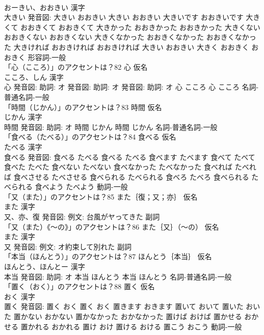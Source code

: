\documentclass[8pt]{extreport}
\begin{document}
\begin{CJK}{UTF8}{min}
\\	おーきい、おおきい 漢字　
\\	大きい 発音図:	大きい おおきい		大きい おおきい 大きいです おおきいです 大きくて おおきくて おおきくて 大きかった おおきかった おおきかった 大きくない おおきくない おおきくない 大きくなかった おおきくなかった おおきくなかった 大きければ おおきければ おおきければ 大きい おおきい 大きく おおきく おおきく				形容詞-一般 
\\	「心（こころ）」のアクセントは？82	心 仮名　
\\	こころ、しん 漢字　
\\	心 発音図: 助詞: オ 発音図: 助詞: オ 発音図: 助詞: オ	心 こころ		心 こころ				名詞-普通名詞-一般 
\\	「時間（じかん）」のアクセントは？83	時間 仮名　
\\	じかん 漢字　
\\	時間 発音図: 助詞: オ	時間 じかん		時間 じかん				名詞-普通名詞-一般 
\\	「食べる（たべる）」のアクセントは？84	食べる 仮名　
\\	たべる 漢字　
\\	食べる 発音図:	食べる たべる		食べる たべる 食べます たべます 食べて たべて 食べた たべた 食べない たべない 食べなかった たべなかった 食べれば たべれば 食べさせる たべさせる 食べられる たべられる 食べろ たべろ 食べられる たべられる 食べよう たべよう				動詞-一般 
\\	「又（また）」のアクセントは？85	また｛復；又；亦｝ 仮名　
\\	また 漢字　
\\	又、亦、復 発音図: 例文: 台風がヤってきた							副詞 
\\	「又（また）《〜の》」のアクセントは？86	また｛又｝（〜の） 仮名　
\\	また 漢字　
\\	又 発音図: 例文: オ約束して別れた							副詞 
\\	「本当（ほんとう）」のアクセントは？87	ほんとう｛本当｝ 仮名　
\\	ほんとう、ほんとー 漢字　
\\	本当 発音図: 助詞: オ	本当 ほんとう		本当 ほんとう				名詞-普通名詞-一般 
\\	「置く（おく）」のアクセントは？88	置く 仮名　
\\	おく 漢字　
\\	置く 発音図:	置く おく		置く おく 置きます おきます 置いて おいて 置いた おいた 置かない おかない 置かなかった おかなかった 置けば おけば 置かせる おかせる 置かれる おかれる 置け おけ 置ける おける 置こう おこう				動詞-一般 

\end{CJK}
\end{document}
